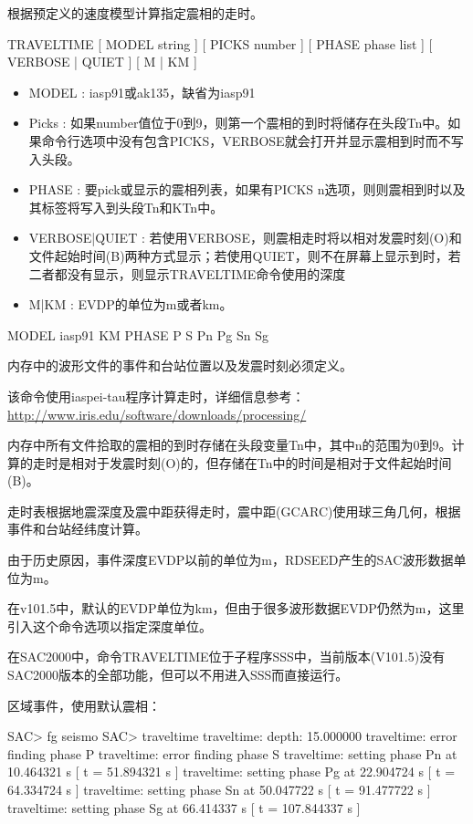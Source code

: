 \label{cmd:traveltime}

根据预定义的速度模型计算指定震相的走时。

TRAVELTIME [ MODEL string ] [ PICKS number ] [ PHASE phase list ] [ VERBOSE | QUIET ] [ M | KM ]

\begin{itemize}
\item MODEL : iasp91或ak135，缺省为iasp91
\item Picks : 如果number值位于0到9，则第一个震相的到时将储存在头段Tn中。如果命令行选项中没有包含PICKS，VERBOSE就会打开并显示震相到时而不写入头段。
\item PHASE : 要pick或显示的震相列表，如果有PICKS n选项，则则震相到时以及其标签将写入到头段Tn和KTn中。 
\item VERBOSE|QUIET : 若使用VERBOSE，则震相走时将以相对发震时刻(O)和文件起始时间(B)两种方式显示；若使用QUIET，则不在屏幕上显示到时，若二者都没有显示，则显示TRAVELTIME命令使用的深度 
\item M|KM : EVDP的单位为m或者km。
\end{itemize}

MODEL iasp91 KM PHASE P S Pn Pg Sn Sg

内存中的波形文件的事件和台站位置以及发震时刻必须定义。

该命令使用iaspei-tau程序计算走时，详细信息参考：\\
\href{http://www.iris.edu/software/downloads/processing/}{http://www.iris.edu/software/downloads/processing/}

内存中所有文件拾取的震相的到时存储在头段变量Tn中，其中n的范围为0到9。计算的走时是相对于发震时刻(O)的，但存储在Tn中的时间是相对于文件起始时间(B)。

走时表根据地震深度及震中距获得走时，震中距(GCARC)使用球三角几何，根据事件和台站经纬度计算。

由于历史原因，事件深度EVDP以前的单位为m，RDSEED产生的SAC波形数据单位为m。

在v101.5中，默认的EVDP单位为km，但由于很多波形数据EVDP仍然为m，这里引入这个命令选项以指定深度单位。

在SAC2000中，命令TRAVELTIME位于子程序SSS中，当前版本(V101.5)没有SAC2000版本的全部功能，但可以不用进入SSS而直接运行。

区域事件，使用默认震相：
\begin{SACCode}
SAC> fg seismo
SAC> traveltime 
traveltime: depth: 15.000000
traveltime: error finding phase P       
traveltime: error finding phase S       
traveltime: setting phase Pn       at 10.464321 s [ t = 51.894321 s ]
traveltime: setting phase Pg       at 22.904724 s [ t = 64.334724 s ]
traveltime: setting phase Sn       at 50.047722 s [ t = 91.477722 s ]
traveltime: setting phase Sg      at 66.414337 s [ t = 107.844337 s ]
\end{SACCode} 

